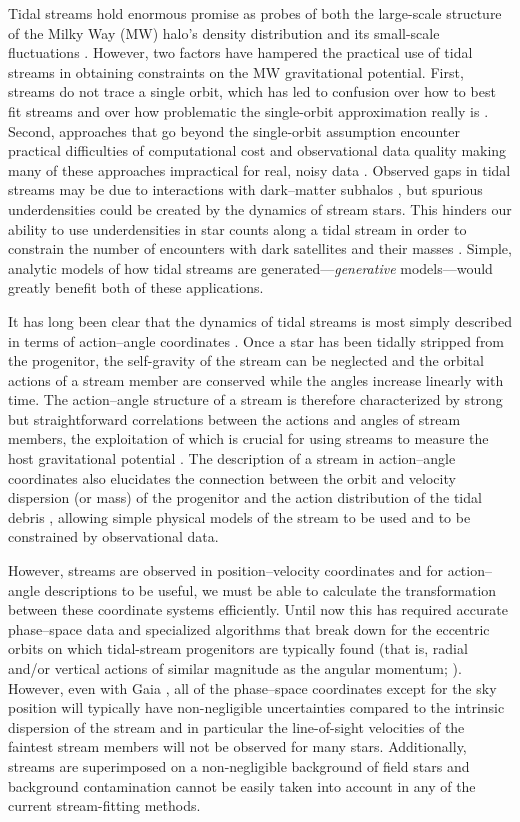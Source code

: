 \documentclass[12pt,preprint]{aastex}
\newcommand{\eg}{e.g.}
\begin{document}
Tidal streams hold enormous promise as probes of both the large-scale
structure of the Milky Way (MW) halo's density distribution
\citep[\eg,][]{Johnston99a,Koposov10a} and its small-scale
fluctuations \citep{Carlberg12a}. However, two factors have hampered
the practical use of tidal streams in obtaining constraints on the MW
gravitational potential. First, streams do not trace a single orbit,
which has led to confusion over how to best fit streams and over how
problematic the single-orbit approximation really is
\citep{Eyre11a,Sanders13a}. Second, approaches that go beyond the
single-orbit assumption encounter practical difficulties of
computational cost and observational data quality making many of these
approaches impractical for real, noisy data
\citep{Sanders13b,PriceWhelan13a}. Observed gaps in tidal streams may
be due to interactions with dark--matter subhalos \citep{Yoon11a}, but
spurious underdensities could be created by the dynamics of stream
stars. This hinders our ability to use underdensities in star counts
along a tidal stream in order to constrain the number of encounters
with dark satellites and their masses \citep{Ngan14a}. Simple,
analytic models of how tidal streams are generated---\emph{generative}
models---would greatly benefit both of these applications.

It has long been clear that the dynamics of tidal streams is most
simply described in terms of action--angle coordinates
\citep{Tremaine99a,Helmi99a}. Once a star has been tidally stripped
from the progenitor, the self-gravity of the stream can be neglected
and the orbital actions of a stream member are conserved while the
angles increase linearly with time. The action--angle structure of a
stream is therefore characterized by strong but straightforward
correlations between the actions and angles of stream members, the
exploitation of which is crucial for using streams to measure the host
gravitational potential \citep{Sanders13b}. The description of a
stream in action--angle coordinates also elucidates the connection
between the orbit and velocity dispersion (or mass) of the progenitor
and the action distribution of the tidal debris \citep{Eyre11a},
allowing simple physical models of the stream to be used and to be
constrained by observational data.

However, streams are observed in position--velocity coordinates and
for action--angle descriptions to be useful, we must be able to
calculate the transformation between these coordinate systems
efficiently. Until now this has required accurate phase--space data
and specialized algorithms that break down for the eccentric orbits on
which tidal-stream progenitors are typically found (that is, radial
and/or vertical actions of similar magnitude as the angular momentum;
\citealt{Sanders12a}). However, even with Gaia \citep{Perryman01a},
all of the phase--space coordinates except for the sky position will
typically have non-negligible uncertainties compared to the intrinsic
dispersion of the stream and in particular the line-of-sight
velocities of the faintest stream members will not be observed for
many stars. Additionally, streams are superimposed on a non-negligible
background of field stars and background contamination cannot be
easily taken into account in any of the current stream-fitting
methods.
\end{document}
